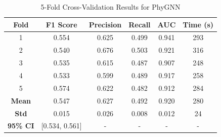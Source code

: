 \begin{table}[htbp]
\centering
\caption{5-Fold Cross-Validation Results for PhyGNN}
\label{tab:cv_results}
\begin{tabular}{cccccc}
\hline
\textbf{Fold} & \textbf{F1 Score} & \textbf{Precision} & \textbf{Recall} & \textbf{AUC} & \textbf{Time (s)} \\
\hline
1 & 0.554 & 0.625 & 0.499 & 0.941 & 293 \\
2 & 0.540 & 0.676 & 0.503 & 0.921 & 316 \\
3 & 0.535 & 0.615 & 0.487 & 0.907 & 248 \\
4 & 0.533 & 0.599 & 0.489 & 0.917 & 258 \\
5 & 0.574 & 0.622 & 0.482 & 0.912 & 284 \\
\hline
\textbf{Mean} & 0.547 & 0.627 & 0.492 & 0.920 & 280 \\
\textbf{Std} & 0.015 & 0.026 & 0.008 & 0.012 & 24 \\
\textbf{95\% CI} & [0.534, 0.561] & - & - & - & - \\
\hline
\end{tabular}
\end{table}